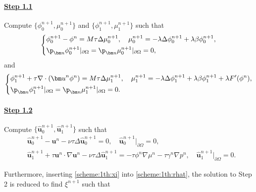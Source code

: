 \paragraph{\bf\underline{Step 1.1}} Compute $\{\phi_0^{n+1}, \mu_0^{n+1}\}$ and $\{\phi_1^{n+1}, \mu_1^{n+1}\}$ such that
\begin{equation} \label{scheme:1th:phi0}
	\left\{
	\begin{aligned}
		& \phi_0^{n+1}-\phi^n=M \tau \Delta \mu_0^{n+1}, \quad \mu_0^{n+1}=- \lambda\Delta \phi_0^{n+1} + \lambda \beta \phi_0^{n+1},  \\
		& \p_{\bm n} \phi_0^{n+1}|_{\partial \Omega}=\p_{\bm n} \mu_0^{n+1}|_{\partial \Omega}=0, 
	\end{aligned} \right.
\end{equation}
and
\begin{equation}  \label{scheme:1th:phi1}
	\left\{
	\begin{aligned}
		& \phi_1^{n+1}+\tau \nabla \cdot({\bm u}^n \phi^n )=M \tau \Delta \mu_1^{n+1}, \quad \mu_1^{n+1}=-  \lambda\Delta \phi_1^{n+1} +\lambda \beta \phi_1^{n+1} + \lambda  F^{\prime}(\phi^n), \\
		&   \p_{\bm n} \phi_1^{n+1}|_{\partial \Omega}=\p_{\bm n} \mu_1^{n+1}|_{\partial \Omega}=0.
	\end{aligned} \right.
\end{equation}

\paragraph{\bf \underline{Step 1.2}} Compute $\{\widehat{\bm u}_0^{n+1}, \widehat{\bm u}_1^{n+1}\} $ such that
\begin{align} 
	& \widehat{\bm u}_0^{n+1} - {\bm u}^n -\nu \tau \Delta  \widehat{\bm u}_0^{n+1} = 0,  \quad \widehat{\bm u}_0^{n+1}|_{\partial \Omega}=0, \label{scheme:1th:uhat0}\\
	& \widehat{\bm u}_1^{n+1} +\tau {\bm u}^n \cdot \nabla {\bm u}^n -\nu \tau \Delta \widehat{\bm u}_1^{n+1} =-\tau \phi^n \nabla \mu^n-\tau\gamma^n \nabla p^n,  \quad \widehat{\bm u}_1^{n+1} \big|_{\partial \Omega}=0. \label{scheme:1th:uhat1}
\end{align}

Furthermore, inserting \eqref{scheme:1th:xi} into \eqref{scheme:1th:rhat}, the solution to Step 2 is reduced to find $\xi^{n+1}$ such that
